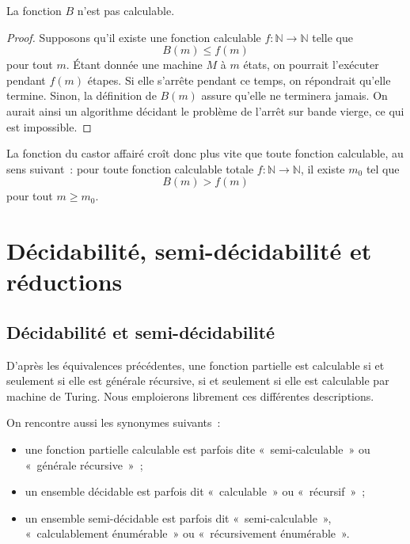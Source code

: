 \begin{prop}\label{busy-beaver-not-computable}
La fonction $B$ n'est pas calculable.
\end{prop}

\begin{proof}
Supposons qu'il existe une fonction calculable
$f\colon\mathbb{N}\to\mathbb{N}$ telle que
\[
B(m)\leq f(m)
\]
pour tout $m$.  Étant donnée une machine $M$ à $m$ états, on pourrait
l'exécuter pendant $f(m)$ étapes.  Si elle s'arrête pendant ce temps,
on répondrait qu'elle termine.  Sinon, la définition de $B(m)$ assure
qu'elle ne terminera jamais.  On aurait ainsi un algorithme décidant
le problème de l'arrêt sur bande vierge, ce qui est impossible.
\end{proof}

La fonction du castor affairé croît donc plus vite que toute fonction
calculable, au sens suivant : pour toute fonction calculable totale
$f\colon\mathbb{N}\to\mathbb{N}$, il existe $m_0$ tel que
\[
B(m)>f(m)
\]
pour tout $m\geq m_0$.


\section{Décidabilité, semi-décidabilité et réductions}

\subsection{Décidabilité et semi-décidabilité}
\label{subsection-decidability-semidecidability}

\thingy D'après les équivalences précédentes, une fonction partielle
est calculable si et seulement si elle est générale récursive, si et
seulement si elle est calculable par machine de Turing.  Nous
emploierons librement ces différentes descriptions.

On rencontre aussi les synonymes suivants :
\begin{itemize}
\item une fonction partielle calculable est parfois dite
  « semi-calculable » ou « générale récursive » ;
\item un ensemble décidable est parfois dit « calculable » ou
  « récursif » ;
\item un ensemble semi-décidable est parfois dit
  « semi-calculable », « calculablement énumérable » ou
  « récursivement énumérable ».
\end{itemize}


